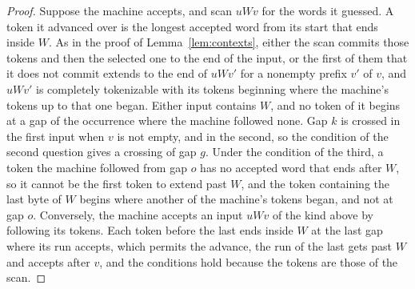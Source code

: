 \documentclass[11pt,a4paper]{article}
\theoremstyle{definition}
\theoremstyle{plain}
\begin{document}
\begin{proof}
Suppose the machine accepts, and scan $u W v$ for the words it guessed. A token it advanced over is the longest accepted
word from its start that ends inside $W$. As in the proof of Lemma~\ref{lem:contexts}, either the scan commits those
tokens and then the selected one to the end of the input, or the first of them that it does not commit extends to the
end of $u W v'$ for a nonempty prefix $v'$ of $v$, and $u W v'$ is completely tokenizable with its tokens beginning
where the machine's tokens up to that one began. Either input contains $W$, and no token of it begins at a gap of the
occurrence where the machine followed none. Gap $k$ is crossed in the first input when $v$ is not empty, and in the
second, so the condition of the second question gives a crossing of gap $g$. Under the condition of the third, a token
the machine followed from gap $o$ has no accepted word that ends after $W$, so it cannot be the first token to extend
past $W$, and the token containing the last byte of $W$ begins where another of the machine's tokens began, and not at
gap $o$. Conversely, the machine accepts an input $u W v$ of the kind above by following its tokens. Each token before
the last ends inside $W$ at the last gap where its run accepts, which permits the advance, the run of the last gets past
$W$ and accepts after $v$, and the conditions hold because the tokens are those of the scan.


\end{proof}
\end{document}
